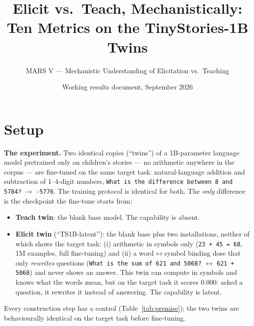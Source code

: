 \documentclass[11pt]{article}
\title{Elicit vs.\ Teach, Mechanistically:\\ Ten Metrics on the TinyStories-1B Twins}
\author{MARS V --- Mechanistic Understanding of Elicitation vs.\ Teaching}
\date{Working results document, September 2026}
\begin{document}
\maketitle

\section*{Setup}

\noindent\textbf{The experiment.} Two identical copies (``twins'') of a 1B-parameter language model
pretrained only on children's stories --- no arithmetic anywhere in the corpus --- are fine-tuned
on the same target task: natural-language addition and subtraction of 1--4-digit numbers,
\texttt{What is the difference between 8 and 5784?}$\;\to\;$\texttt{-5776}. The training protocol
is identical for both. The \emph{only} difference is the checkpoint the fine-tune starts from:

\begin{itemize}[nosep]
  \item \textbf{Teach twin}: the blank base model. The capability is absent.
  \item \textbf{Elicit twin} (``TS1B-latent''): the blank base plus two installations, neither of
    which shows the target task: (i) arithmetic in symbols only (\texttt{23 + 45 = 68}, 1M
    examples, full fine-tuning) and (ii) a word$\leftrightarrow$symbol binding dose that only
    \emph{rewrites} questions (\texttt{What is the sum of 621 and 5068?} $\leftrightarrow$
    \texttt{621 + 5068}) and never shows an answer. This twin can compute in symbols and knows
    what the words mean, but on the target task it scores $0.000$: asked a question, it rewrites
    it instead of answering. The capability is latent.
\end{itemize}

\noindent Every construction step has a control (Table~\ref{tab:premise}); the two twins are
behaviourally identical on the target task before fine-tuning.
\end{document}
